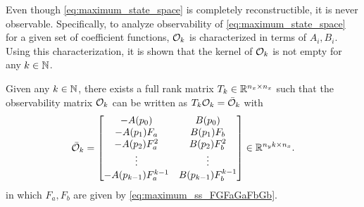 Even though \eqref{eq:maximum_state_space} is completely reconstructible, it is never observable. Specifically, to analyze observability of \eqref{eq:maximum_state_space} for a given set of coefficient functions, $\mathcal{O}_k$ is characterized in terms of $A_i,B_i$. Using this characterization, it is shown that the kernel of $\mathcal{O}_k$ is not empty for any $k\in\mathbb{N}$.

\begin{lemma}\label{lem:Ocalbar}
    Given any $k\in\mathbb{N}$, there exists a full rank matrix $T_k \in \mathbb{R}^{n_x \times n_x}$ such that the observability matrix $\mathcal{O}_k$ can be written as $T_k \mathcal{O}_k = \bar{\mathcal{O}}_k$ with 
        \begin{equation} \label{eq:Ocalbar}
        \bar{\mathcal{O}}_{k} = \begin{bmatrix}
        -A(p_0) & B(p_0) \\
        -A(p_1) F_a & B(p_1) F_b \\
        -A(p_2) F_a^2 & B(p_2) F_b^2 \\
        \vdots & \vdots \\
        -A(p_{k-1}) F_a^{k-1} & B(p_{k-1}) F_b^{k-1} \\
    \end{bmatrix} \in \mathbb{R}^{n_y k \times n_x}.
    \end{equation}
    in which $F_a,F_b$ are given by \eqref{eq:maximum_ss_FGFaGaFbGb}.
\end{lemma}
